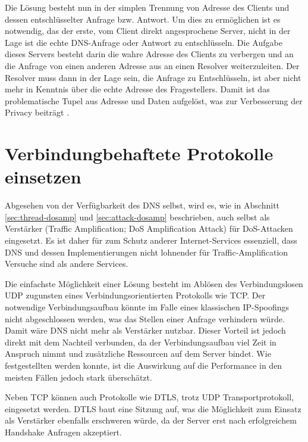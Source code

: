 Die Lösung besteht nun in der simplen Trennung von Adresse des Clients und dessen entschlüsselter Anfrage bzw. Antwort. Um dies zu ermöglichen ist es notwendig, das der erste, vom Client direkt angesprochene Server, nicht in der Lage ist die echte DNS-Anfrage oder Antwort zu entschlüsseln. Die Aufgabe dieses Servers besteht darin die wahre Adresse des Clients zu verbergen und an die Anfrage von einen anderen Adresse aus an einen Resolver weiterzuleiten. Der Resolver muss dann in der Lage sein, die Anfrage zu Entschlüsseln, ist aber nicht mehr in Kenntnis über die echte Adresse des Fragestellers. Damit ist das problematische Tupel aus Adresse und Daten aufgelöst, was zur Verbesserung der Privacy beiträgt \cite{Schmitt2018}.

\section{Verbindungbehaftete Protokolle einsetzen}
\label{sec:goals-trafficamp}
Abgesehen von der Verfügbarkeit des DNS selbst, wird es, wie in Abschnitt \ref{sec:thread-dosamp} und \ref{sec:attack-dosamp} beschrieben, auch selbst als Verstärker (Traffic Amplification; DoS Amplification Attack) für DoS-Attacken eingesetzt. Es ist daher für zum Schutz anderer Internet-Services essenziell, dass DNS und dessen Implementierungen nicht lohnender für Traffic-Amplification Versuche sind als andere Services.

Die einfachste Möglichkeit einer Lösung besteht im Ablösen des Verbindungslosen UDP zugunsten eines Verbindungsorientierten Protokolls wie TCP. Der notwendige Verbindungsaufbau könnte im Falle eines klassischen IP-Spoofings nicht abgeschlossen werden, was das Stellen einer Anfrage verhindern würde. Damit wäre DNS nicht mehr als Verstärker nutzbar. Dieser Vorteil ist jedoch direkt mit dem Nachteil verbunden, da der Verbindungsaufbau viel Zeit in Anspruch nimmt und zusätzliche Ressourcen auf dem Server bindet. Wie festgestellten werden konnte, ist die Auswirkung auf die Performance in den meisten Fällen jedoch stark überschätzt\cite{Zhu2015}.

Neben TCP können auch Protokolle wie DTLS, trotz UDP Transportprotokoll, eingesetzt werden. DTLS baut eine Sitzung auf, was die Möglichkeit zum Einsatz als Verstärker ebenfalls erschweren würde, da der Server erst nach erfolgreichem Handshake Anfragen akzeptiert\cite{rfc6347}. 
